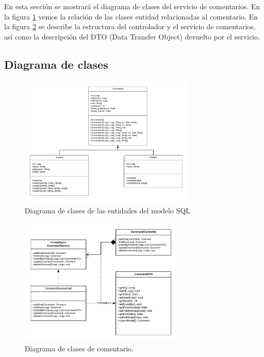 En esta sección se mostrará el diagrama de clases del servicio de comentarios. En la figura \ref{entClases} vemos la relación de las clases entidad relacionadas al comentario. En la figura \ref{daoClases} se describe la estructura del controlador y el servicio de comentarios, así como la descripción del DTO (Data Transfer Object) devuelto por el servicio. 

\subsection{Diagrama de clases}

\begin{figure}[H]
	\centering
	\includegraphics[width=0.75\textwidth]{imaxes/entClases.png}
	\caption{Diagrama de clases de las entidades del modelo SQL}
	\label{entClases}
\end{figure}

\begin{figure}[H]
	\centering
	\includegraphics[width=0.70\textwidth]{imaxes/daoClases.png}
	\caption{Diagrama de clases de comentario.}
	\label{daoClases}
\end{figure}